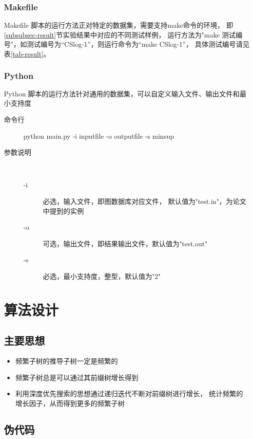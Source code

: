 \documentclass{ctexart}
\let\stdsection\section
\renewcommand\section{\newpage\stdsection}
\begin{document}
\subsubsection{Makefile}

Makefile 脚本的运行方法正对特定的数据集，需要支持make命令的环境，
即\ref{subsubsec-result}节实验结果中对应的不同测试样例，
运行方法为"make 测试编号"，如测试编号为“CSlog-1”，则运行命令为“make CSlog-1”，
具体测试编号请见表\ref{tab-result}。

\subsubsection{Python}

Python 脚本的运行方法针对通用的数据集，可以自定义输入文件、输出文件和最小支持度

\begin{description}
    \item [命令行] python main.py -i inputfile -o outputfile -s minsup
    \item [参数说明] ~
    \begin{description}
        \item[-i] 必选，输入文件，即图数据库对应文件，
            默认值为"test.in"，为论文中提到的实例
        \item[-o] 可选，输出文件，即结果输出文件，默认值为"test.out"
        \item[-s] 必选，最小支持度，整型，默认值为"2"
    \end{description}
\end{description}

\section{算法设计}

\subsection{主要思想}

\begin{itemize}
    \item 频繁子树的推导子树一定是频繁的
    \item 频繁子树总是可以通过其前缀树增长得到
    \item 利用深度优先搜索的思想通过递归迭代不断对前缀树进行增长，
        统计频繁的增长因子，从而得到更多的频繁子树
\end{itemize}

\subsection{伪代码}
\end{document}
